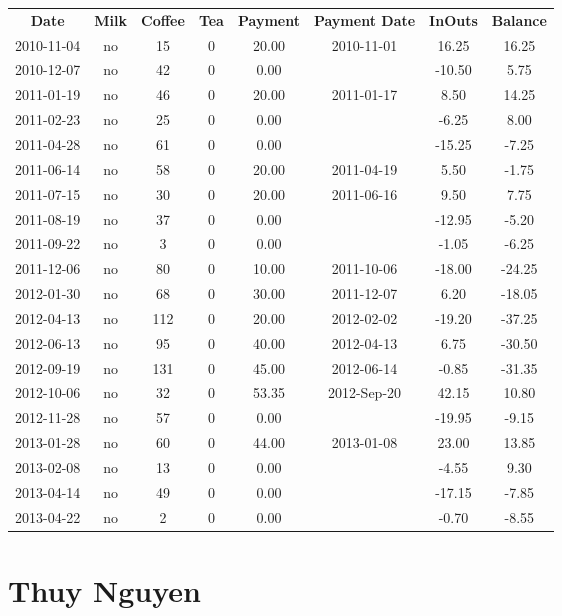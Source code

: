 \begin{center}
\begin{tabular}{cccccccc}
\textbf{Date} & \textbf{Milk} & \textbf{Coffee} & \textbf{Tea} & \textbf{Payment} & \textbf{Payment Date} & \textbf{InOuts} & \textbf{Balance} \\
2010-11-04 & no &  15 & 0 & 20.00 & 2010-11-01 &  16.25 &  16.25\\ 
2010-12-07 & no &  42 & 0 &  0.00 &  & -10.50 &   5.75\\ 
2011-01-19 & no &  46 & 0 & 20.00 & 2011-01-17 &   8.50 &  14.25\\ 
2011-02-23 & no &  25 & 0 &  0.00 &  &  -6.25 &   8.00\\ 
2011-04-28 & no &  61 & 0 &  0.00 &  & -15.25 &  -7.25\\ 
2011-06-14 & no &  58 & 0 & 20.00 & 2011-04-19 &   5.50 &  -1.75\\ 
2011-07-15 & no &  30 & 0 & 20.00 & 2011-06-16 &   9.50 &   7.75\\ 
2011-08-19 & no &  37 & 0 &  0.00 &  & -12.95 &  -5.20\\ 
2011-09-22 & no &   3 & 0 &  0.00 &  &  -1.05 &  -6.25\\ 
2011-12-06 & no &  80 & 0 & 10.00 & 2011-10-06 & -18.00 & -24.25\\ 
2012-01-30 & no &  68 & 0 & 30.00 & 2011-12-07 &   6.20 & -18.05\\ 
2012-04-13 & no & 112 & 0 & 20.00 & 2012-02-02 & -19.20 & -37.25\\ 
2012-06-13 & no &  95 & 0 & 40.00 & 2012-04-13 &   6.75 & -30.50\\ 
2012-09-19 & no & 131 & 0 & 45.00 & 2012-06-14 &  -0.85 & -31.35\\ 
2012-10-06 & no &  32 & 0 & 53.35 & 2012-Sep-20 &  42.15 &  10.80\\ 
2012-11-28 & no &  57 & 0 &  0.00 &  & -19.95 &  -9.15\\ 
2013-01-28 & no &  60 & 0 & 44.00 & 2013-01-08 &  23.00 &  13.85\\ 
2013-02-08 & no &  13 & 0 &  0.00 &  &  -4.55 &   9.30\\ 
2013-04-14 & no &  49 & 0 &  0.00 &  & -17.15 &  -7.85\\ 
2013-04-22 & no &   2 & 0 &  0.00 &  &  -0.70 &  -8.55
\end{tabular}
\end{center}

\section{Thuy Nguyen}

